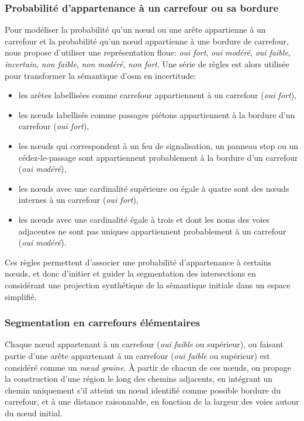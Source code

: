 \subsubsection{Probabilité d'appartenance à un carrefour ou sa bordure}

Pour modéliser la probabilité qu'un nœud ou une arête appartienne à un carrefour et la probabilité qu'un nœud appartienne à une bordure de carrefour, nous propose d'utiliser une représentation floue: \textit{oui fort}, \textit{oui modéré}, \textit{oui faible}, \textit{incertain}, \textit{non faible}, \textit{non modéré}, \textit{non fort}. Une série de règles est alors utilisée pour transformer la sémantique d'\gls{osm} en incertitude:

\begin{itemize}
    \item  les arêtes labellisées comme carrefour appartiennent à un carrefour (\textit{oui fort}),
    \item  les nœuds labellisés comme passages piétons appartiennent à la bordure d'un carrefour  (\textit{oui fort}),
    \item  les nœuds qui correspondent à un feu de signalisation, un panneau stop ou un cédez-le-passage sont appartiennent probablement à la bordure d'un carrefour (\textit{oui modéré}),
    \item  les nœuds avec une cardinalité supérieure ou égale à quatre sont des nœuds internes à un carrefour (\textit{oui fort}),
    \item  les nœuds avec une cardinalité égale à trois et dont les noms des voies adjacentes ne sont pas uniques appartiennent probablement à un carrefour (\textit{oui modéré}).
\end{itemize}

\newpar{}

Ces règles permettent d'associer une probabilité d'appartenance à certains nœuds, et donc d'initier et guider la segmentation des intersections en considérant une projection synthétique de la sémantique initiale dans un espace simplifié.

\subsubsection{Segmentation en carrefours élémentaires}

Chaque nœud appartenant à un carrefour (\textit{oui faible} ou supérieur), ou faisant partie d'une arête appartenant à un carrefour (\textit{oui faible} ou supérieur) est considéré comme un \emph{nœud graine}. À partir de chacun de ces nœuds, on propage la construction d'une région le long des chemins adjacents, en intégrant un chemin uniquement s'il atteint un nœud identifié comme possible bordure du carrefour, et à une distance raisonnable, en fonction de la largeur des voies autour du nœud initial.

